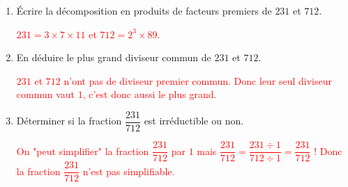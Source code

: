         \begin{enumerate}
            \item Écrire la décomposition en produits de facteurs premiers de $231$ et $712$.

            \textcolor{red}{
                $231=3\times 7\times 11$ et $712= 2^3\times 89$.
            }
            \item En déduire le plus grand diviseur commun de $231$ et $712$.

            \textcolor{red}{
                $231$ et $712$ n'ont pas de diviseur premier commun. Donc leur seul diviseur commun vaut $1$, c'est donc aussi le plus grand.
            }
            \item Déterminer si la fraction $\dfrac{231}{712}$ est irréductible ou non.

            \textcolor{red}{
                On "peut simplifier" la fraction $\dfrac{231}{712}$ par $1$ mais $\dfrac{231}{712} = \dfrac{231\div 1}{712\div 1} = \dfrac{231}{712}$ !
                Donc la fraction $\dfrac{231}{712}$ n'est pas simplifiable.
            }
        \end{enumerate}
